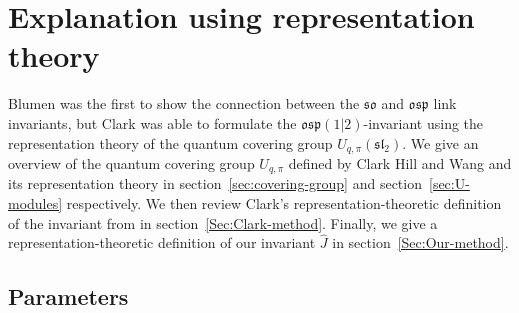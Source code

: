 \documentclass{amsart}
\newcommand{\hackcenter}[1]{
 \xy (0,0)*{#1}; \endxy}
\theoremstyle{plain}
\theoremstyle{definition}
\theoremstyle{definition}
\numberwithin{equation}{section}
\numberwithin{theorem}{section}
\def\mf{\mathfrak}
\numberwithin{equation}{section}
\let\hat=\widehat
\begin{document}

\section{Explanation using representation theory}

Blumen\cite{Blu09} was the first to show the connection between the $\mf{so}$ and $\mf{osp}$ link invariants, but Clark\cite{C} was able to formulate the $\mf{osp}(1|2)$-invariant using the representation theory of the quantum covering group $U_{q,\pi}(\mf{sl}_2)$.
We give an overview of the quantum covering group $U_{q,\pi}$ defined by Clark Hill and Wang \cite{CHW} and its representation theory in section~\ref{sec:covering-group} and section~\ref{sec:U-modules} respectively.
We then review Clark's representation-theoretic definition of the invariant from \cite{C} in section~\ref{Sec:Clark-method}.
Finally, we give a representation-theoretic definition of our invariant $\hat{J}$ in section~\ref{Sec:Our-method}.

\subsection{Parameters}\label{sec:3.1}
\end{document}
